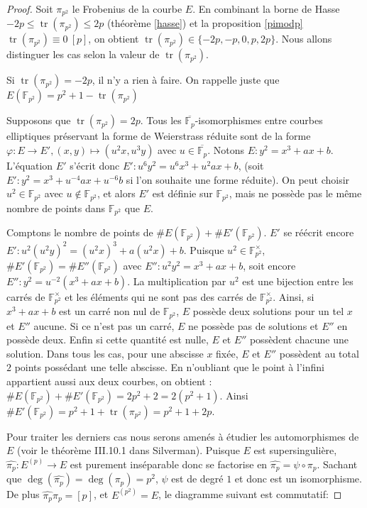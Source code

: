 \documentclass{article}
\theoremstyle{plain}%
\theoremstyle{definition}%
\newcommand{\F}{\mathbb{F}}
\DeclareMathOperator{\tr}{tr}
\begin{document}
\begin{proof}
  Soit $\pi_{p^2}$ le Frobenius de la courbe $E$. En combinant la borne de Hasse $-2p \le \tr(\pi_{p^2}) \le 2p$ (théorème \ref{hasse}) et la proposition \ref{pimodp} $\tr(\pi_{p^2}) \equiv 0\ [p]$, on obtient $\tr(\pi_{p^2}) \in \{-2p, -p, 0, p, 2p\}$.  Nous allons distinguer les cas selon la valeur de $\tr(\pi_{p^2})$.
   
  \vspace{1em}
  Si $\tr(\pi_{p^2}) = -2p$, il n'y a rien à faire. On rappelle juste que $E(\F_{p^2}) = p^2 + 1 - \tr(\pi_{p^2})$ 
    
  \vspace{1em}
  Supposons que $\tr(\pi_{p^2}) = 2p$. Tous les $\overline{\F_p}$-isomorphismes entre courbes elliptiques préservant la forme de Weierstrass réduite sont de la forme 
      $\varphi : E \to E', (x, y) \mapsto (u^2 x, u^3 y)$ avec $u\in\overline{\F_p}$. Notons $E : y^2 = x^3 + ax +b$. L'équation $E'$ s'écrit donc $E' : u^6 y^2 = u^6 x^3 + u^2 a x + b$, (soit $E' : y^2 = x^3 + u^{-4} a x + u^{-6}b$ si l'on souhaite une forme réduite). On peut choisir $u^2\in\F_{p^2}$ avec $u\notin \F_{p^2}$, et alors $E'$ est définie sur $\F_{p^2}$, mais ne possède pas le même nombre de points dans $\F_{p^2}$ que $E$.

Comptons le nombre de points de $\#E(\F_{p^2}) + \#E'(\F_{p^2})$. $E'$ se réécrit encore $E' : u^2 (u^2 y)^2 = (u^2 x)^3 + a (u^2 x) + b$. Puisque $u^2\in \F_{p^2}^\times$, $\#E'(\F_{p^2}) = \#E''(\F_{p^2})$ avec $E'' : u^2 y^2 = x^3 + a x + b$, soit encore $E'' : y^2 = u^{-2} (x^3 + ax + b)$.
      La multiplication par $u^2$ est une bijection entre les carrés de $\F_{p^2}^\times$ et les éléments qui ne sont pas des carrés de $\F_{p^2}^\times$. 
      Ainsi, si $x^3 + ax + b$ est un carré non nul de $\F_{p^2}$, $E$ possède deux solutions pour un tel $x$ et $E''$ aucune. Si ce n'est pas un carré, $E$ ne possède pas de solutions et $E''$ en possède deux. Enfin si cette quantité est nulle, $E$ et $E''$ possèdent chacune une solution. 
Dans tous les cas, pour une abscisse $x$ fixée, $E$ et $E''$ possèdent au total $2$ points possédant une telle abscisse.
En n'oubliant que le point à l'infini appartient aussi aux deux courbes, on obtient :
      $ \#E(\F_{p^2}) + \#E'(\F_{p^2}) = 2p^2  + 2 = 2(p^2 + 1)$. Ainsi $\#E'(\F_{p^2}) = p^2 + 1 + \tr(\pi_{p^2}) = p^2 + 1 + 2p$. 
     
\vspace{1em}
Pour traiter les derniers cas nous serons amenés à étudier les automorphismes de $E$ (voir le théorème III.10.1 dans Silverman). Puisque $E$ est supersingulière, $\widehat{\pi_p} : E^{(p)} \to E$ est purement inséparable donc se factorise en  $\widehat{\pi_p} = \psi \circ \pi_p$. Sachant que $\deg(\widehat{\pi_p}) = \deg(\pi_p) = p^2$, $\psi$ est de degré $1$ et donc est un isomorphisme. De plus $\widehat{\pi_p}\pi_p = [p]$, et $E^{(p^2)} = E$, le diagramme suivant est commutatif: 


\end{proof}
\end{document}

